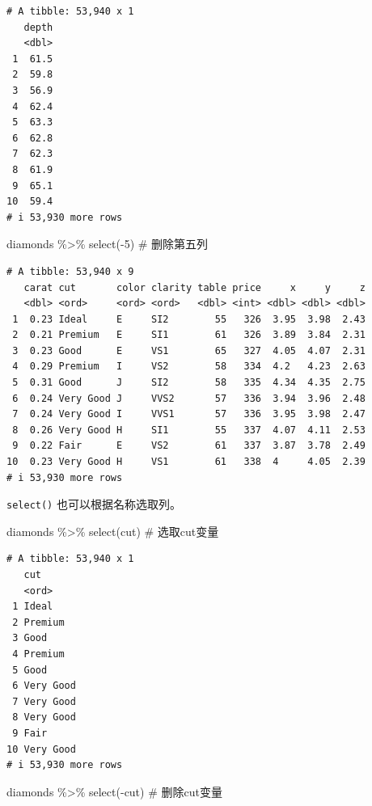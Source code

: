 \documentclass[
  letterpaper,
]{ctexbook}
\newenvironment{Shaded}{\begin{snugshade}}{\end{snugshade}}
\newcommand{\CommentTok}[1]{\textcolor[rgb]{0.37,0.37,0.37}{#1}}
\newcommand{\DecValTok}[1]{\textcolor[rgb]{0.68,0.00,0.00}{#1}}
\newcommand{\FunctionTok}[1]{\textcolor[rgb]{0.28,0.35,0.67}{#1}}
\newcommand{\NormalTok}[1]{\textcolor[rgb]{0.00,0.23,0.31}{#1}}
\newcommand{\SpecialCharTok}[1]{\textcolor[rgb]{0.37,0.37,0.37}{#1}}
\begin{document}
\begin{verbatim}
# A tibble: 53,940 x 1
   depth
   <dbl>
 1  61.5
 2  59.8
 3  56.9
 4  62.4
 5  63.3
 6  62.8
 7  62.3
 8  61.9
 9  65.1
10  59.4
# i 53,930 more rows
\end{verbatim}

\begin{Shaded}
\begin{Highlighting}[]
\NormalTok{diamonds }\SpecialCharTok{\%\textgreater{}\%}
  \FunctionTok{select}\NormalTok{(}\SpecialCharTok{{-}}\DecValTok{5}\NormalTok{) }\CommentTok{\# 删除第五列}
\end{Highlighting}
\end{Shaded}

\begin{verbatim}
# A tibble: 53,940 x 9
   carat cut       color clarity table price     x     y     z
   <dbl> <ord>     <ord> <ord>   <dbl> <int> <dbl> <dbl> <dbl>
 1  0.23 Ideal     E     SI2        55   326  3.95  3.98  2.43
 2  0.21 Premium   E     SI1        61   326  3.89  3.84  2.31
 3  0.23 Good      E     VS1        65   327  4.05  4.07  2.31
 4  0.29 Premium   I     VS2        58   334  4.2   4.23  2.63
 5  0.31 Good      J     SI2        58   335  4.34  4.35  2.75
 6  0.24 Very Good J     VVS2       57   336  3.94  3.96  2.48
 7  0.24 Very Good I     VVS1       57   336  3.95  3.98  2.47
 8  0.26 Very Good H     SI1        55   337  4.07  4.11  2.53
 9  0.22 Fair      E     VS2        61   337  3.87  3.78  2.49
10  0.23 Very Good H     VS1        61   338  4     4.05  2.39
# i 53,930 more rows
\end{verbatim}

\texttt{select()} 也可以根据名称选取列。

\begin{Shaded}
\begin{Highlighting}[]
\NormalTok{diamonds }\SpecialCharTok{\%\textgreater{}\%}
  \FunctionTok{select}\NormalTok{(cut) }\CommentTok{\# 选取cut变量}
\end{Highlighting}
\end{Shaded}

\begin{verbatim}
# A tibble: 53,940 x 1
   cut      
   <ord>    
 1 Ideal    
 2 Premium  
 3 Good     
 4 Premium  
 5 Good     
 6 Very Good
 7 Very Good
 8 Very Good
 9 Fair     
10 Very Good
# i 53,930 more rows
\end{verbatim}

\begin{Shaded}
\begin{Highlighting}[]
\NormalTok{diamonds }\SpecialCharTok{\%\textgreater{}\%}
  \FunctionTok{select}\NormalTok{(}\SpecialCharTok{{-}}\NormalTok{cut) }\CommentTok{\# 删除cut变量}
\end{Highlighting}
\end{Shaded}
\end{document}
